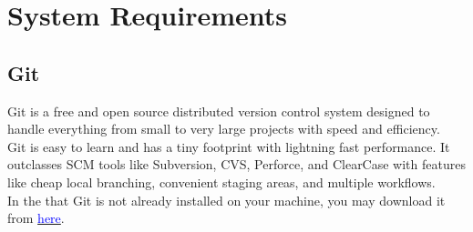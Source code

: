 \section{System Requirements}


\subsection{Git}
Git is a free and open source distributed version control system designed to handle everything from small to very large projects with speed and efficiency.\\
Git is easy to learn and has a tiny footprint with lightning fast performance. It outclasses SCM tools like Subversion, CVS, Perforce, and ClearCase with features like cheap local branching, convenient staging areas, and multiple workflows.\\

In the that Git is not already installed on your machine, you may download it from \href{https://git-scm.com/downloads}{\textcolor{blue}{here}}.

